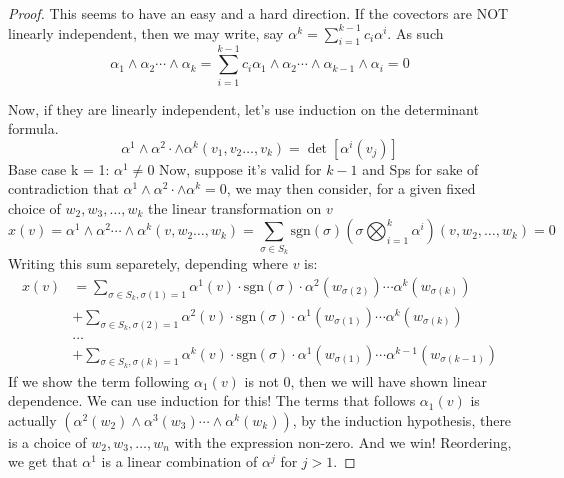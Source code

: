 \begin{problem}
\end{problem}
\begin{proof}
	This seems to have an easy and a hard direction.
	If the covectors are NOT linearly independent, then we may write, say $\alpha^k = \sum_{i=1}^{k-1} c_i \alpha^i$. As such
	$$\alpha_1 \wedge \alpha_2 \cdots \wedge \alpha_k = \sum_{i = 1}^{k-1} c_i \alpha_1 \wedge \alpha_2 \cdots \wedge \alpha_{k-1} \wedge \alpha_i = 0$$

	Now, if they are linearly independent, let's use induction on the determinant formula.
	$$\alpha^1 \wedge \alpha^2 \cdot \wedge \alpha^k(v_1, v_2 \dots, v_k) = \det[\alpha^i (v_j)]$$
	Base case k = 1: $\alpha^1 \neq 0$
	Now, suppose it's valid for $k-1$ and
	Sps for sake of contradiction that $\alpha^1 \wedge \alpha^2 \cdot \wedge \alpha^k = 0$, we may then consider, for a given fixed choice of $w_2,w_3,\dots,w_k$ the linear transformation on $v$
	$$x(v) = \alpha^1 \wedge \alpha^2 \cdots \wedge \alpha^k(v, w_2 \dots, w_k) = \sum_{\sigma \in S_k} \text{sgn}(\sigma)(\sigma \bigotimes_{i = 1}^{k} \alpha^i)(v,w_2, \dots, w_k) = 0$$
	Writing this sum separetely, depending where $v$ is:
	\begin{align*}
		x(v) & = \sum_{\sigma \in S_{k}, \sigma(1) = 1} \alpha^1(v) \cdot \text{sgn}(\sigma)\cdot \alpha^2(w_{\sigma(2)}) \cdots  \alpha^k(w_{\sigma(k)})       \\
		     & + \sum_{\sigma \in S_{k}, \sigma(2) = 1} \alpha^2(v) \cdot \text{sgn}(\sigma)\cdot \alpha^1(w_{\sigma(1)}) \cdots  \alpha^k(w_{\sigma(k)})       \\
		     & \dots                                                                                                                                            \\
		     & + \sum_{\sigma \in S_{k}, \sigma(k) = 1} \alpha^k(v) \cdot \text{sgn}(\sigma)\cdot \alpha^1(w_{\sigma(1)}) \cdots  \alpha^{k-1}(w_{\sigma(k-1)})
	\end{align*}
	If we show the term following $\alpha_1(v)$ is not $0$, then we will have shown linear dependence. We can use induction for this!
	The terms that follows $\alpha_1(v)$ is actually $(\alpha^2(w_2)\wedge \alpha^3(w_3) \cdots \wedge \alpha^k(w_k))$, by the induction hypothesis,
	there is a choice of $w_2, w_3, \dots, w_n$ with the expression non-zero. And we win!
	Reordering, we get that $\alpha^1$ is a linear combination of $\alpha^j$ for $j > 1$.
\end{proof}

